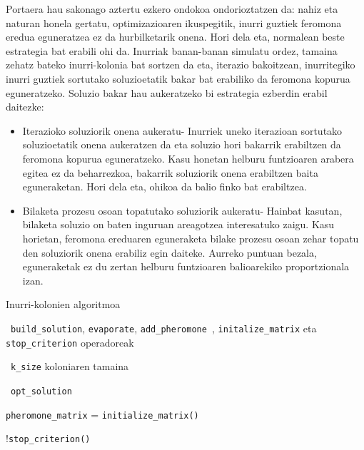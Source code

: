 \documentclass[eu]{ifirak}\usepackage[]{graphicx}\usepackage[]{color}
\begin{document}
Portaera hau sakonago aztertu ezkero ondokoa ondorioztatzen da: nahiz eta naturan honela gertatu, optimizazioaren ikuspegitik, inurri guztiek feromona eredua eguneratzea ez da hurbilketarik onena. Hori dela eta, normalean beste estrategia bat erabili ohi da. Inurriak banan-banan simulatu ordez, tamaina zehatz bateko inurri-kolonia  bat sortzen da eta, iterazio bakoitzean, inurritegiko inurri guztiek sortutako soluzioetatik bakar bat erabiliko da feromona kopurua eguneratzeko. Soluzio bakar hau aukeratzeko bi estrategia ezberdin erabil daitezke:

\begin{itemize}
\item Iterazioko soluziorik onena aukeratu- Inurriek uneko iterazioan sortutako soluzioetatik onena aukeratzen da eta soluzio hori bakarrik erabiltzen da feromona kopurua eguneratzeko. Kasu honetan helburu funtzioaren arabera egitea ez da beharrezkoa, bakarrik soluziorik onena erabiltzen baita eguneraketan. Hori dela eta, ohikoa da balio finko bat erabiltzea.
\item Bilaketa prozesu osoan topatutako soluziorik aukeratu- Hainbat kasutan, bilaketa soluzio on baten inguruan areagotzea interesatuko zaigu. Kasu horietan, feromona ereduaren eguneraketa bilake prozesu osoan zehar topatu den soluziorik onena erabiliz egin daiteke. Aurreko puntuan bezala, eguneraketak ez du zertan  helburu funtzioaren balioarekiko proportzionala izan.
\end{itemize}


\begin{ifalgorithm}[t]
\begin{ifpseudo}{Inurri-kolonien algoritmoa}
\item \In\ \texttt{build\_solution}, \texttt{evaporate}, \texttt{add\_pheromone }, \texttt{initalize\_matrix} eta \texttt{stop\_criterion} operadoreak
\item \In\ \texttt{k\_size} koloniaren tamaina
\item \Out\ \texttt{opt\_solution}
\item \texttt{pheromone\_matrix} = \texttt{initialize\_matrix()}
\item \While !\texttt{stop\_criterion()}
\item {}
\item {}
\item {}
\item {}
\item {}
\item \TT{\EIf}
\item \T{\Done}
\item {}
\item \Done
\end{ifpseudo}
\caption{Inurri-kolonien algoritmoaren sasikodea}\label{alg:ant}
\end{ifalgorithm}
\end{document}
